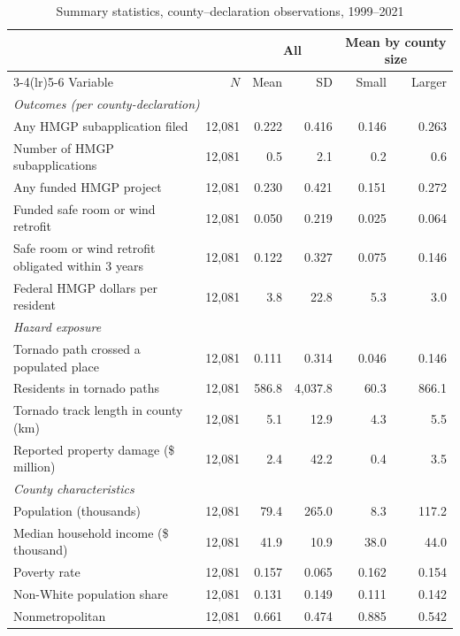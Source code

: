 \begin{table}[!htbp]
\centering
\small
\begin{threeparttable}
\caption{Summary statistics, county--declaration observations, 1999--2021}
\label{tab:summary}
\begin{tabular}{@{}lrrrrr@{}}
\toprule
 & & \multicolumn{2}{c}{All} & \multicolumn{2}{c}{Mean by county size} \\
\cmidrule(lr){3-4}\cmidrule(lr){5-6}
Variable & $N$ & Mean & SD & Small & Larger \\
\midrule
\multicolumn{6}{l}{\textit{Outcomes (per county-declaration)}} \\
\quad Any HMGP subapplication filed & 12,081 & 0.222 & 0.416 & 0.146 & 0.263 \\
\quad Number of HMGP subapplications & 12,081 & 0.5 & 2.1 & 0.2 & 0.6 \\
\quad Any funded HMGP project & 12,081 & 0.230 & 0.421 & 0.151 & 0.272 \\
\quad Funded safe room or wind retrofit & 12,081 & 0.050 & 0.219 & 0.025 & 0.064 \\
\quad Safe room or wind retrofit obligated within 3 years & 12,081 & 0.122 & 0.327 & 0.075 & 0.146 \\
\quad Federal HMGP dollars per resident & 12,081 & 3.8 & 22.8 & 5.3 & 3.0 \\
\multicolumn{6}{l}{\textit{Hazard exposure}} \\
\quad Tornado path crossed a populated place & 12,081 & 0.111 & 0.314 & 0.046 & 0.146 \\
\quad Residents in tornado paths & 12,081 & 586.8 & 4,037.8 & 60.3 & 866.1 \\
\quad Tornado track length in county (km) & 12,081 & 5.1 & 12.9 & 4.3 & 5.5 \\
\quad Reported property damage (\$ million) & 12,081 & 2.4 & 42.2 & 0.4 & 3.5 \\
\multicolumn{6}{l}{\textit{County characteristics}} \\
\quad Population (thousands) & 12,081 & 79.4 & 265.0 & 8.3 & 117.2 \\
\quad Median household income (\$ thousand) & 12,081 & 41.9 & 10.9 & 38.0 & 44.0 \\
\quad Poverty rate & 12,081 & 0.157 & 0.065 & 0.162 & 0.154 \\
\quad Non-White population share & 12,081 & 0.131 & 0.149 & 0.111 & 0.142 \\
\quad Nonmetropolitan & 12,081 & 0.661 & 0.474 & 0.885 & 0.542 \\

\end{tabular}
\end{threeparttable}
\end{table}
